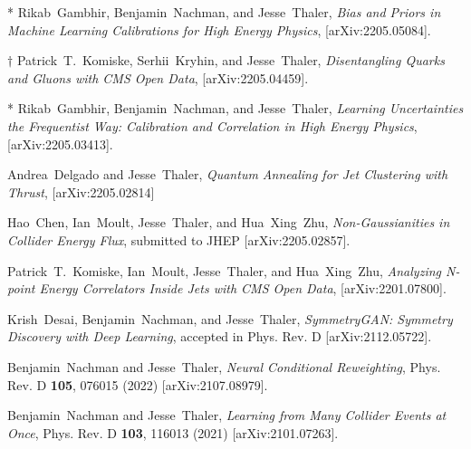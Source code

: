 \documentclass[11pt]{article}
\renewcommand{\bibitem}[1]{\item}
\begin{document}
\begin{list}{[]\addtocounter{jessecount}{-1}}{\leftmargin=3em \itemsep=4pt}


\bibitem{xxx}
* Rikab~Gambhir, Benjamin~Nachman, and Jesse~Thaler,
\emph{Bias and Priors in Machine Learning Calibrations for High Energy Physics},
[arXiv:2205.05084].

\bibitem{Komiske:2022vxg}
$\dagger$ Patrick~T.~Komiske, Serhii~Kryhin, and Jesse~Thaler,
\emph{Disentangling Quarks and Gluons with CMS Open Data},
[arXiv:2205.04459].

\bibitem{Gambhir:2022gua}
* Rikab~Gambhir, Benjamin~Nachman, and Jesse~Thaler,
\emph{Learning Uncertainties the Frequentist Way: Calibration and Correlation in High Energy Physics},
[arXiv:2205.03413].

\bibitem{Delgado:2022snu}
Andrea~Delgado and Jesse~Thaler,
\emph{Quantum Annealing for Jet Clustering with Thrust},
[arXiv:2205.02814]

\bibitem{Chen:2022swd}
Hao~Chen, Ian~Moult, Jesse~Thaler, and Hua~Xing~Zhu,
\emph{Non-Gaussianities in Collider Energy Flux},
submitted to JHEP
[arXiv:2205.02857].

\bibitem{Komiske:2022enw}
Patrick~T.~Komiske, Ian~Moult, Jesse~Thaler, and Hua~Xing~Zhu,
\emph{Analyzing N-point Energy Correlators Inside Jets with CMS Open Data},
[arXiv:2201.07800].

\bibitem{Desai:2021wbb}
Krish~Desai, Benjamin~Nachman, and Jesse~Thaler,
\emph{SymmetryGAN: Symmetry Discovery with Deep Learning},
accepted in Phys. Rev. D
[arXiv:2112.05722].

\bibitem{Nachman:2021opi}
Benjamin~Nachman and Jesse~Thaler,
\emph{Neural Conditional Reweighting},
Phys. Rev. D \textbf{105}, 076015 (2022)
[arXiv:2107.08979].

\bibitem{Nachman:2021yvi}
Benjamin~Nachman and Jesse~Thaler,
\emph{Learning from Many Collider Events at Once},
Phys. Rev. D \textbf{103}, 116013 (2021)
[arXiv:2101.07263].


\end{list}
\end{document}
